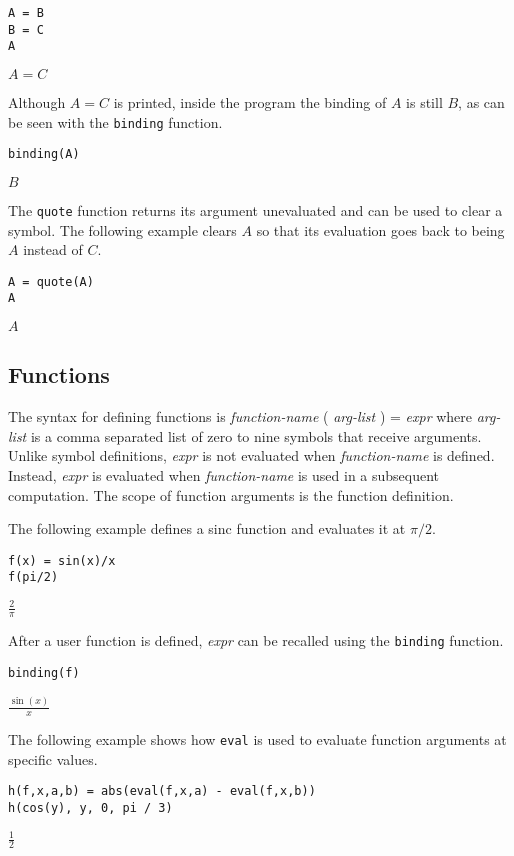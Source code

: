 {\color{blue}
\begin{verbatim}
A = B
B = C
A
\end{verbatim}
}

\noindent
$\displaystyle A=C$

\bigskip
\noindent
Although $A=C$ is printed,
inside the program the binding of $A$ is still $B$, as can be seen with
the \verb$binding$ function.

{\color{blue}
\begin{verbatim}
binding(A)
\end{verbatim}
}

\noindent
$\displaystyle B$

\bigskip
\noindent
The \verb$quote$ function returns its argument unevaluated
and can be used to clear a symbol.
The following example clears $A$ so that its evaluation goes back to
being $A$ instead of $C$.

{\color{blue}
\begin{verbatim}
A = quote(A)
A
\end{verbatim}
}

\noindent
$\displaystyle A$

\subsection{Functions}

\noindent
The syntax for defining functions is {\it function-name} ( {\it arg-list} ) = {\it expr}
where {\it arg-list} is a comma separated list of zero to nine symbols that receive arguments.
Unlike symbol definitions, {\it expr} is not evaluated when {\it function-name} is defined.
Instead, {\it expr} is evaluated when {\it function-name} is used in a subsequent computation.
The scope of function arguments is the function definition.

\bigskip

The following example defines a sinc function and evaluates it at $\pi/2$.

{\color{blue}
\begin{verbatim}
f(x) = sin(x)/x
f(pi/2)
\end{verbatim}
}

\noindent
$\displaystyle \frac{2}{\pi}$

\bigskip

After a user function is defined, {\it expr} can be recalled using the \verb$binding$ function.

{\color{blue}
\begin{verbatim}
binding(f)
\end{verbatim}
}

\noindent
$\displaystyle \frac{\sin(x)}{x}$

\bigskip

The following example shows how \verb$eval$ is used to evaluate function arguments at specific values.

{\color{blue}
\begin{verbatim}
h(f,x,a,b) = abs(eval(f,x,a) - eval(f,x,b))
h(cos(y), y, 0, pi / 3)
\end{verbatim}
}

\noindent
$\frac{1}{2}$
